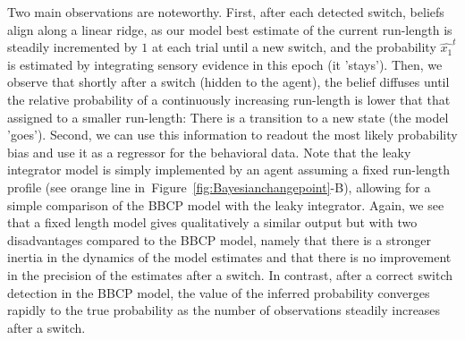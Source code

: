 \documentclass[12pt,english]{article}%
\newcommand{\seeFig}[1]{Figure~\ref{fig:#1}}
\begin{document}
Two main observations are noteworthy. First, after each detected switch, beliefs align along a linear ridge,
as our model best estimate of the current run-length is steadily incremented by $1$ at each trial until a new switch, 
and the probability $\hat{x_1}^t$ is estimated  by integrating sensory evidence in this epoch (it 'stays').
Then, we observe that shortly after a switch (hidden to the agent),
the belief diffuses until the relative probability of a continuously increasing run-length
is lower that that assigned to a smaller run-length:
There is a transition to a new state (the model 'goes').
Second, we can use this information to readout the most likely probability bias and 
use it as a regressor for the behavioral data.
Note that the leaky integrator model is simply implemented
by an agent assuming a fixed run-length profile (see orange line in~\seeFig{Bayesianchangepoint}-B),
allowing for a simple comparison of the BBCP model with the leaky integrator.
Again, we see that a fixed length model gives qualitatively a similar output
but with two disadvantages compared to the BBCP model, namely that 
there is a stronger inertia in the dynamics of the model estimates and 
that there is no improvement in the precision of the estimates after a switch.
In contrast, after a correct switch detection in the BBCP model, 
the value of the inferred probability converges rapidly to the true probability
as the number of observations steadily increases after a switch.
\end{document}
